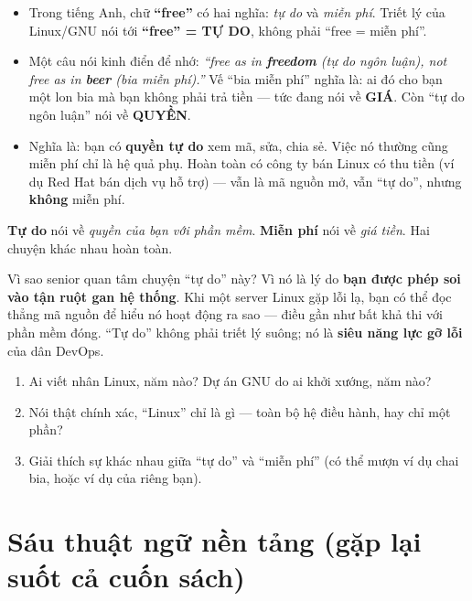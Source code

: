 \documentclass[12pt,a4paper]{article}
\begin{document}
\begin{itemize}[leftmargin=*]
  \item Trong tiếng Anh, chữ \textbf{``free''} có hai nghĩa: \textit{tự do} và \textit{miễn phí}. Triết lý của Linux/GNU nói tới \textbf{``free'' = TỰ DO}, không phải ``free = miễn phí''.
  \item Một câu nói kinh điển để nhớ: \textit{``free as in \textbf{freedom} (tự do ngôn luận), not free as in \textbf{beer} (bia miễn phí).''} Vế ``bia miễn phí'' nghĩa là: ai đó cho bạn một lon bia mà bạn không phải trả tiền — tức đang nói về \textbf{GIÁ}. Còn ``tự do ngôn luận'' nói về \textbf{QUYỀN}.
  \item Nghĩa là: bạn có \textbf{quyền tự do} xem mã, sửa, chia sẻ. Việc nó thường cũng miễn phí chỉ là hệ quả phụ. Hoàn toàn có công ty bán Linux có thu tiền (ví dụ Red Hat bán dịch vụ hỗ trợ) — vẫn là mã nguồn mở, vẫn ``tự do'', nhưng \textbf{không} miễn phí.
\end{itemize}

\begin{tipbox}
\textbf{Tự do} nói về \textit{quyền của bạn với phần mềm}. \textbf{Miễn phí} nói về \textit{giá tiền}. Hai chuyện khác nhau hoàn toàn.
\end{tipbox}

\begin{seniorbox}
Vì sao senior quan tâm chuyện ``tự do'' này? Vì nó là lý do \textbf{bạn được phép soi vào tận ruột gan hệ thống}. Khi một server Linux gặp lỗi lạ, bạn có thể đọc thẳng mã nguồn để hiểu nó hoạt động ra sao — điều gần như bất khả thi với phần mềm đóng. ``Tự do'' không phải triết lý suông; nó là \textbf{siêu năng lực gỡ lỗi} của dân DevOps.
\end{seniorbox}

\begin{quizbox}
\begin{enumerate}[leftmargin=*]
  \item Ai viết nhân Linux, năm nào? Dự án GNU do ai khởi xướng, năm nào?
  \item Nói thật chính xác, ``Linux'' chỉ là gì — toàn bộ hệ điều hành, hay chỉ một phần?
  \item Giải thích sự khác nhau giữa ``tự do'' và ``miễn phí'' (có thể mượn ví dụ chai bia, hoặc ví dụ của riêng bạn).
\end{enumerate}
\end{quizbox}

\section{Sáu thuật ngữ nền tảng (gặp lại suốt cả cuốn sách)}
\end{document}
